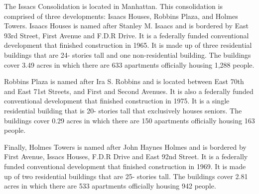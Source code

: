 The Issacs Consolidation is located in Manhattan. This consolidation is comprised of three developments: Isaacs Houses, Robbins Plaza, and Holmes Towers. Isaacs Houses is named after Stanley M. Isaacs and is bordered by East 93rd Street, First Avenue and F.D.R Drive. It is a federally funded conventional development that finished construction in 1965. It is made up of three residential buildings that are 24- stories tall and one non-residential building. The buildings cover 3.49 acres in which there are 633 apartments officially housing 1,288 people.  \par \vspace{.7\baselineskip}Robbins Plaza is named after Ira S. Robbins and is located between East 70th and East 71st Streets, and First and Second Avenues. It is also a federally funded conventional development that finished construction in 1975. It is a single residential building that is 20- stories tall that exclusively houses seniors. The buildings cover 0.29 acres in which there are 150 apartments officially housing 163 people.  \par \vspace{.7\baselineskip}Finally, Holmes Towers is named after John Haynes Holmes and is bordered by First Avenue, Issacs Houses, F.D.R Drive and East 92nd Street. It is a federally funded conventional development that finished construction in 1969. It is made up of two residential buildings that are 25- stories tall. The buildings cover 2.81 acres in which there are 533 apartments officially housing 942 people.